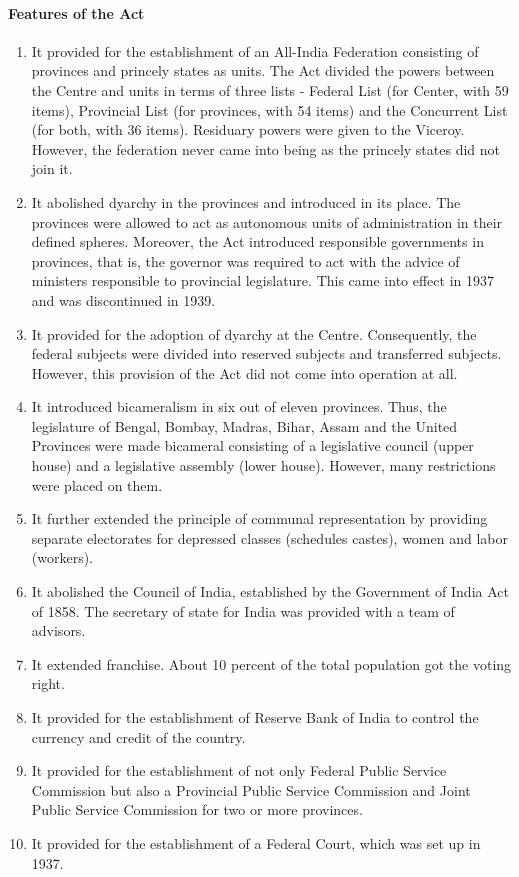 \paragraph{Features of the Act}
\begin{enumerate}
  \item It provided for the establishment of an All-India Federation consisting of provinces and princely states as units. The Act divided the powers between the Centre and units in terms of three lists - Federal List (for Center, with 59 items), Provincial List (for provinces, with 54 items) and the Concurrent List (for both, with 36 items). Residuary powers were given to the Viceroy. However, the federation never came into being as the princely states did not join it.
  \item It abolished dyarchy in the provinces and introduced  in its place. The provinces were allowed to act as autonomous units of administration in their defined spheres. Moreover, the Act introduced responsible governments in provinces, that is, the governor was required to act with the advice of ministers responsible to provincial legislature. This came into effect in 1937 and was discontinued in 1939.
  \item It provided for the adoption of dyarchy at the Centre. Consequently, the federal subjects were divided into reserved subjects and transferred subjects. However, this provision of the Act did not come into operation at all.
  \item It introduced bicameralism in six out of eleven provinces. Thus, the legislature of Bengal, Bombay, Madras, Bihar, Assam and the United Provinces were made bicameral consisting of a legislative council (upper house) and a legislative assembly (lower house). However, many restrictions were placed on them.
  \item It further extended the principle of communal representation by providing separate electorates for depressed classes (schedules castes), women and labor (workers).
  \item It abolished the Council of India, established by the Government of India Act of 1858. The secretary of state for India was provided with a team of advisors.
  \item It extended franchise. About 10 percent of the total population got the voting right.
  \item It provided for the establishment of Reserve Bank of India to control the currency and credit of the country.
  \item It provided for the establishment of not only Federal Public Service Commission but also a Provincial Public Service Commission and Joint Public Service Commission for two or more provinces.
  \item It provided for the establishment of a Federal Court, which was set up in 1937.
\end{enumerate}


